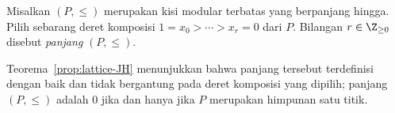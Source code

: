 \begin{definisi}\label{def:lattice-length}
	Misalkan $(P,\leq)$ merupakan kisi modular terbatas yang berpanjang hingga.
	Pilih sebarang deret komposisi $1=x_0>\cdots>x_r=0$ dari $P$. Bilangan
	$r \in \Z_{\geq 0}$ disebut \emph{panjang} $(P,\leq)$.
\end{definisi}

Teorema~\ref{prop:lattice-JH} menunjukkan bahwa panjang tersebut terdefinisi
dengan baik dan tidak bergantung pada deret komposisi yang dipilih; panjang
$(P,\leq)$ adalah $0$ jika dan hanya jika $P$ merupakan himpunan satu titik.

